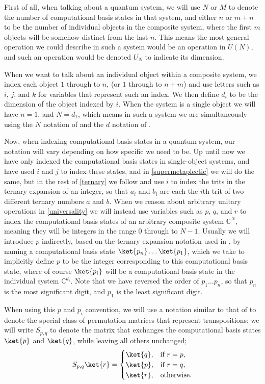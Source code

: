 First of all, when talking about a quantum system, we will use $N$ or $M$ to denote the number of computational basis states in that system, and either $n$ or $m+n$ to be the number of individual objects in the composite system, where the first $m$ objects will be somehow distinct from the last $n$. This means the most general operation we could describe in such a system would be an operation in $U(N)$, and such an operation would be denoted $U_N$ to indicate its dimension.

When we want to talk about an individual object within a composite system, we index each object $1$ through to $n$, (or $1$ through to $n+m$) and use letters such as $i$, $j$, and $k$ for variables that represent such an index. We then define $d_i$ to be the dimension of the object indexed by $i$. When the system is a single object we will have $n = 1$, and $N = d_1$, which means in such a system we are simultaneously using the $N$ notation of \cite{tolar-clifford} and the $d$ notation of \cite{multi-valued-logic}.

Now, when indexing computational basis states in a quantum system, our notation will vary depending on how specific we need to be. Up until now we have only indexed the computational basis states in single-object systems, and have used $i$ and $j$ to index these states, and in \autoref{supermetaplectic} we will do the same, but in the rest of \autoref{ternary} we follow \cite{arithmetics} and use $i$ to index the trits in the ternary expansion of an integer, so that $a_i$ and $b_i$ are each the $i$th trit of two different ternary numbers $a$ and $b$. When we reason about arbitrary unitary operations in \autoref{universality} we will instead use variables such as $p$, $q$, and $r$ to index the computational basis states of an arbitrary composite system $\mathbb{C}^N$, meaning they will be integers in the range $0$ through to $N-1$. Usually we will introduce $p$ indirectly, based on the ternary expansion notation used in \cite{arithmetics}, by naming a computational basis state $\ket{p_n}\dots\ket{p_1}$, which we take to implicitly define $p$ to be the integer corresponding to this computational basis state, where of course $\ket{p_i}$ will be a computational basis state in the individual system $\mathbb{C}^{d_i}$. Note that we have reversed the order of $p_1 \dots p_n$, so that $p_n$ is the most significant digit, and $p_1$ is the least significant digit.

When using this $p$ and $p_i$ convention, we will use a notation similar to that of \cite{arithmetics} to denote the special class of permutation matrices that represent transpositions; we will write $S_{p,q}$ to denote the matrix that exchanges the computational basis states $\ket{p}$ and $\ket{q}$, while leaving all others unchanged;
\[S_{p,q}\ket{r} = \begin{cases}
	\ket{q}, & \text{if\ } r = p, \\
	\ket{p}, & \text{if\ } r = q, \\
	\ket{r}, & \text{otherwise.}
\end{cases}\]

